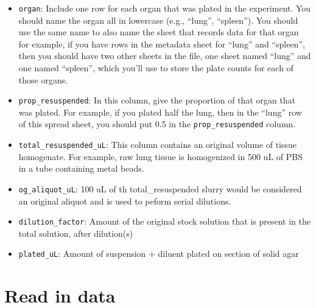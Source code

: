 \documentclass[
]{book}
\providecommand{\tightlist}{%
  \setlength{\itemsep}{0pt}\setlength{\parskip}{0pt}}
\begin{document}
\begin{itemize}
\tightlist
\item
  \texttt{organ}: Include one row for each organ that was plated in the experiment.
  You should name the organ all in lowercase (e.g., ``lung'', ``spleen''). You
  should use the same name to also name the sheet that records data for that organ
  for example, if you have rows in the metadata sheet for ``lung'' and ``spleen'',
  then you should have two other sheets in the file, one sheet named ``lung'' and
  one named ``spleen'', which you'll use to store the plate counts for each of those
  organs.
\item
  \texttt{prop\_resuspended}: In this column, give the proportion of that organ that
  was plated. For example, if you plated half the lung, then in the ``lung'' row
  of this spread sheet, you should put 0.5 in the \texttt{prop\_resuspended} column.
\item
  \texttt{total\_resuspended\_uL}: This column contains an original volume of tissue homogenate. For example, raw lung tissue is homogenized in 500 uL of PBS in a tube containing metal beads.
\item
  \texttt{og\_aliquot\_uL}: 100 uL of th total\_resuspended slurry would be considered an original aliquot and is used to peform serial dilutions.
\item
  \texttt{dilution\_factor}: Amount of the original stock solution that is present in the total solution, after dilution(s)
\item
  \texttt{plated\_uL}: Amount of suspension + diluent plated on section of solid agar
\end{itemize}

\hypertarget{read-in-data-1}{%
\section{Read in data}\label{read-in-data-1}}
\end{document}
